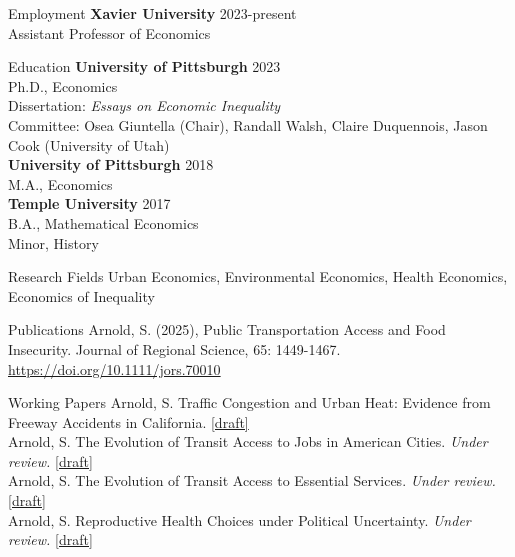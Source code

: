 \documentclass{resume} %
\begin{document}
	
\begin{rSection}{Employment}
{\bf Xavier University} \hfill {2023-present}
\\ Assistant Professor of Economics
\end{rSection}
	
	
\begin{rSection}{Education}
{\bf University of Pittsburgh} \hfill {2023}
\\ Ph.D., Economics \\
Dissertation: \textit{Essays on Economic Inequality} \\
Committee: Osea Giuntella (Chair), Randall Walsh, Claire Duquennois, Jason Cook (University of Utah) \\
{\bf University of Pittsburgh} \hfill {2018}
\\ M.A., Economics \\
{\bf Temple University} \hfill {2017} 
\\ B.A., Mathematical Economics
\\ Minor, History 
\end{rSection}


\begin{rSection}{Research Fields}
Urban Economics, Environmental Economics, Health Economics, Economics of Inequality
\end{rSection}

\begin{rSection}{Publications}
	Arnold, S. (2025), Public Transportation Access and Food Insecurity. Journal of Regional Science, 65: 1449-1467. \url{https://doi.org/10.1111/jors.70010}
\end{rSection}


\begin{rSection}{Working Papers}
	Arnold, S. Traffic Congestion and Urban Heat: Evidence from Freeway Accidents in California. \href{https://smh172.github.io/traffic-urban-heat/Traffic-and-Urban-Heat-Draft.pdf}{[draft]}\\
	Arnold, S. The Evolution of Transit Access to Jobs in American Cities. \textit{Under review.} \href{https://smh172.github.io/evolution-transit-access/evolution_transit_access.pdf}{[draft]}\\
	Arnold, S. The Evolution of Transit Access to Essential Services. \textit{Under review.} \href{https://smh172.github.io/transit-access-essential-services/transit_access_essential_services.pdf}{[draft]}\\
	Arnold, S. Reproductive Health Choices under Political Uncertainty. \textit{Under review.} \href{https://smh172.github.io/reproductive-choices/eb_note.pdf}{[draft]}
\end{rSection}
\end{document}
